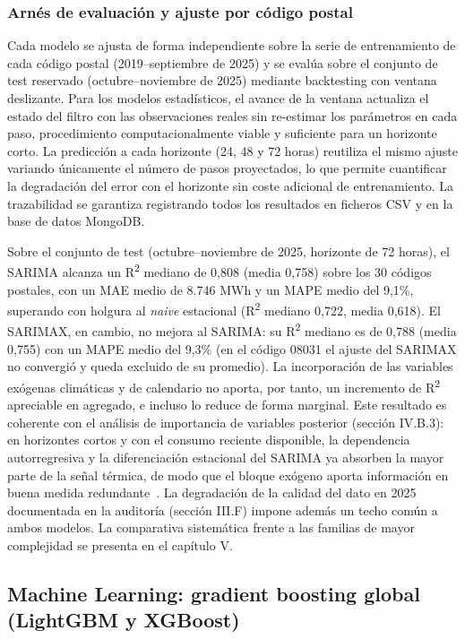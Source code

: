\documentclass[12pt, a4paper]{article}
\begin{document}
\subsubsection{Arnés de evaluación y ajuste por código postal}


Cada modelo se ajusta de forma independiente sobre la serie de entrenamiento de cada código postal (2019--septiembre de 2025) y se evalúa sobre el conjunto de test reservado (octubre--noviembre de 2025) mediante backtesting con ventana deslizante. Para los modelos estadísticos, el avance de la ventana actualiza el estado del filtro con las observaciones reales sin re-estimar los parámetros en cada paso, procedimiento computacionalmente viable y suficiente para un horizonte corto. La predicción a cada horizonte (24, 48 y 72 horas) reutiliza el mismo ajuste variando únicamente el número de pasos proyectados, lo que permite cuantificar la degradación del error con el horizonte sin coste adicional de entrenamiento. La trazabilidad se garantiza registrando todos los resultados en ficheros CSV y en la base de datos MongoDB.

Sobre el conjunto de test (octubre--noviembre de 2025, horizonte de 72 horas), el SARIMA alcanza un R\textsuperscript{2} mediano de 0,808 (media 0,758) sobre los 30 códigos postales, con un MAE medio de 8.746 MWh y un MAPE medio del 9,1\%, superando con holgura al \textit{naive} estacional (R\textsuperscript{2} mediano 0,722, media 0,618). El SARIMAX, en cambio, no mejora al SARIMA: su R\textsuperscript{2} mediano es de 0,788 (media 0,755) con un MAPE medio del 9,3\% (en el código 08031 el ajuste del SARIMAX no convergió y queda excluido de su promedio). La incorporación de las variables exógenas climáticas y de calendario no aporta, por tanto, un incremento de R\textsuperscript{2} apreciable en agregado, e incluso lo reduce de forma marginal. Este resultado es coherente con el análisis de importancia de variables posterior (sección IV.B.3): en horizontes cortos y con el consumo reciente disponible, la dependencia autorregresiva y la diferenciación estacional del SARIMA ya absorben la mayor parte de la señal térmica, de modo que el bloque exógeno aporta información en buena medida redundante~\cite{pardo2002}. La degradación de la calidad del dato en 2025 documentada en la auditoría (sección III.F) impone además un techo común a ambos modelos. La comparativa sistemática frente a las familias de mayor complejidad se presenta en el capítulo V.

\subsection{Machine Learning: gradient boosting global (LightGBM y XGBoost)}
\end{document}
